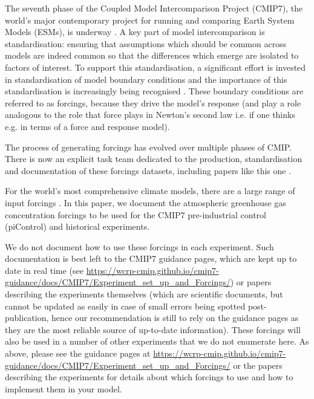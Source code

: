 The seventh phase of the Coupled Model Intercomparison Project (CMIP7),
the world's major contemporary project for running and comparing Earth System Models (ESMs),
is underway \citep{dunne_cmip7_2025}.
A key part of model intercomparison is standardisation:
ensuring that assumptions which should be common across models are indeed common
so that the differences which emerge are isolated to factors of interest.
To support this standardisation,
a significant effort is invested in standardisation of model boundary conditions
and the importance of this standardisation is increasingly being recognised \citep{naik_input-data-releases_2025}.
These boundary conditions are referred to as forcings,
because they drive the model's response
(and play a role analogous to the role that force plays in Newton's second law
i.e. if one thinks e.g. in terms of a force and response model).

The process of generating forcings has evolved over multiple phases of CMIP.
There is now an explicit task team dedicated to the production, standardisation and documentation of these forcings datasets,
including papers like this one \citep{durack_input4mips_2018,durack_forcing_2025}.

For the world's most comprehensive climate models,
there are a large range of input forcings
\citep[e.g. solar forcing,][]{funke_solar_2024}.
In this paper,
we document the atmospheric greenhouse gas concentration forcings to be used for the CMIP7 pre-industrial control (piControl) and historical experiments.

We do not document how to use these forcings in each experiment.
Such documentation is best left to the CMIP7 guidance pages, which are kept up to date in real time
(see \newline \mbox{\url{https://wcrp-cmip.github.io/cmip7-guidance/docs/CMIP7/Experiment_set_up_and_Forcings/}})
or papers describing the experiments themselves
(which are scientific documents, but cannot be updated as easily in case of small errors being spotted post-publication,
hence our recommendation is still to rely on the guidance pages as they are the most reliable source of up-to-date information).
These forcings will also be used in a number of other experiments that we do not enumerate here.
As above, please see the guidance pages at
\newline \mbox{\url{https://wcrp-cmip.github.io/cmip7-guidance/docs/CMIP7/Experiment_set_up_and_Forcings/}}
or the papers describing the experiments for details about which forcings to use
and how to implement them in your model.

